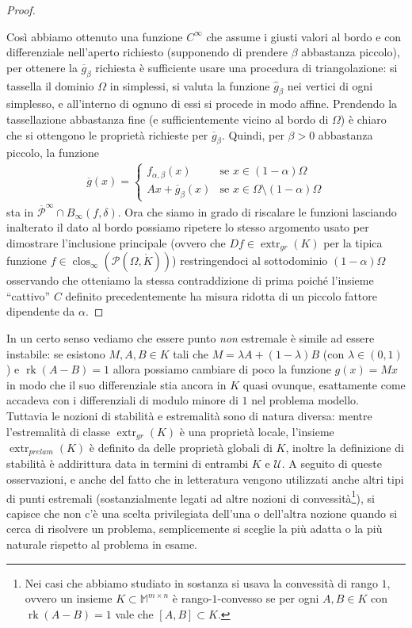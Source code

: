\documentclass[a4paper,11pt]{book}
\theoremstyle{plain}
\theoremstyle{definition}
\theoremstyle{remark}
\newcommand{\M}{\mathbb{M}}
\DeclareMathOperator{\rk}{rk}
\DeclareMathOperator{\clos}{clos}
\DeclareMathOperator{\extr}{extr}
\begin{document}
\begin{proof}
\begin{figure}[H]
\begin{minipage}[c]{0.32\textwidth}
		\end{minipage}
	\end{figure}
	Così abbiamo ottenuto una funzione $C^{\infty}$ che assume i giusti valori al bordo e con differenziale nell'aperto richiesto (supponendo di prendere $\beta$ abbastanza piccolo), per ottenere la $\overline{g}_{\beta}$ richiesta è sufficiente usare una procedura di triangolazione: si tassella il dominio $\Omega$ in simplessi, si valuta la funzione $\hat{g}_{\beta}$ nei vertici di ogni simplesso, e all'interno di ognuno di essi si procede in modo affine. Prendendo la tassellazione abbastanza fine (e sufficientemente vicino al bordo di $\Omega$) è chiaro che si ottengono le proprietà richieste per $\overline{g}_{\beta}$. Quindi, per $\beta>0$ abbastanza piccolo, la funzione
	\begin{align*}
		\overline{g}(x)=\begin{cases}
							f_{\alpha,\beta}(x) & \text{se }x\in(1-\alpha)\Omega\\
							Ax+\overline{g}_{\beta}(x) & \text{se } x\in\Omega\setminus(1-\alpha)\Omega
						\end{cases}
	\end{align*}
	sta in $\overline{\mathscr{P}}^{\infty}\cap B_{\infty}(f,\delta)$. Ora che siamo in grado di riscalare le funzioni lasciando inalterato il dato al bordo possiamo ripetere lo stesso argomento usato per dimostrare l'inclusione principale (ovvero che $Df\in \extr_{gr}(K)$ per la tipica funzione $f\in\clos_{\infty}(\mathscr{P}(\Omega,\mathring{K}))$) restringendoci al sottodominio $(1-\alpha)\Omega$ osservando che otteniamo la stessa contraddizione di prima poiché l'insieme ``cattivo'' $C$ definito precedentemente ha misura ridotta di un piccolo fattore dipendente da $\alpha$.
\end{proof}

In un certo senso vediamo che essere punto \textit{non} estremale è simile ad essere instabile: se esistono $M,A,B\in K$ tali che $M=\lambda A+(1-\lambda)B$ (con $\lambda\in(0,1)$) e $\rk(A-B)=1$ allora possiamo cambiare di poco la funzione $g(x)=Mx$ in modo che il suo differenziale stia ancora in $K$ quasi ovunque, esattamente come accadeva con i differenziali di modulo minore di $1$ nel problema modello.\\
Tuttavia le nozioni di stabilità e estremalità sono di natura diversa: mentre l'estremalità di classe $\extr_{gr}(K)$ è una proprietà locale, l'insieme $\extr_{prelam}(K)$ è definito da delle proprietà globali di $K$, inoltre la definizione di stabilità è addirittura data in termini di entrambi $K$ e $\mathcal{U}$. A seguito di queste osservazioni, e anche del fatto che in letteratura vengono utilizzati anche altri tipi di punti estremali (sostanzialmente legati ad altre nozioni di convessità\footnote{Nei casi che abbiamo studiato in sostanza si usava la convessità di rango $1$, ovvero un insieme $K\subset \M^{m\times n}$ è rango-$1$-convesso se per ogni $A,B\in K$ con $\rk(A-B)=1$ vale che $[A,B]\subset K$.}), si capisce che non c'è una scelta privilegiata dell'una o dell'altra nozione quando si cerca di risolvere un problema, semplicemente si sceglie la più adatta o la più naturale rispetto al problema in esame.
\end{document}
